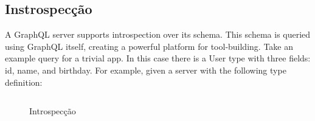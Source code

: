 \subsection[Instrospecção]{Instrospecção}

A GraphQL server supports introspection over its schema. This schema is queried using GraphQL itself, creating a powerful platform for tool‐building. Take an example query for a trivial app. In this case there is a User type with three fields: id, name, and birthday. For example, given a server with the following type definition:

\begin{figure}[H]
  \centering
  \inputminted[frame=single,framesep=10pt]{javascript}{anexos/graphql-introspection.graphql}
  \caption{Introspecção}
\end{figure}
